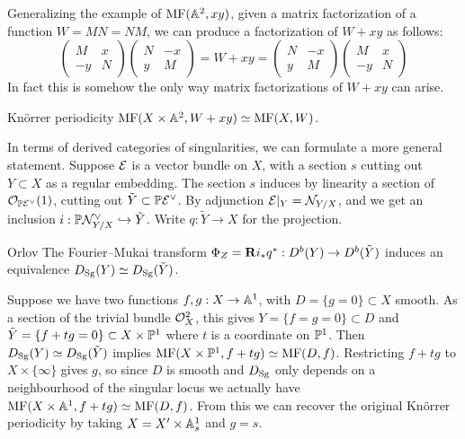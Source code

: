 Generalizing the example of $\MF(\A^2,xy)$, given a matrix factorization of a
function $W=MN=NM$, we can produce a factorization of $W+xy$ as follows:
\begin{equation*}
    \begin{pmatrix}
        M & x \\ -y & N
    \end{pmatrix}\begin{pmatrix}
        N & -x \\ y & M
    \end{pmatrix}
        = W+xy =
    \begin{pmatrix}
        N & -x \\ y & M
    \end{pmatrix}\begin{pmatrix}
        M & x \\ -y & N
    \end{pmatrix}
\end{equation*}
In fact this is somehow the only way matrix factorizations of $W+xy$ can arise.

\begin{theorem}{Kn\"orrer periodicity}{}
    $\MF(X\times\A^2,W+xy)\simeq\MF(X,W)$.
\end{theorem}

In terms of derived categories of singularities, we can formulate a more general
statement. Suppose $\calE$ is a vector bundle on $X$, with a section $s$ cutting
out $Y\subset X$ as a regular embedding. The section $s$ induces by linearity a
section of $\O_{\P\calE^\vee}(1)$, cutting out $\tilde Y\subset\P\calE^\vee$. By
adjunction $\calE|_Y=\calN_{Y/X}$, and we get an inclusion
$i:\P\calN^\vee_{Y/X}\hookrightarrow\tilde Y$. Write $q:\tilde Y\to X$ for the
projection.

\begin{theorem}{Orlov}{}
    The Fourier--Mukai transform $\Phi_Z=\dR i_*q^*:D^b(Y)\to D^b(\tilde Y)$
    induces an equivalence $D_\Sg(Y)\simeq D_\Sg(\tilde Y)$.
\end{theorem}

\begin{example}{}{}
    Suppose we have two functions $f,g:X\to\A^1$, with $D=\{g=0\}\subset X$
    smooth. As a section of the trivial bundle $\O_X^2$, this gives
    $Y=\{f=g=0\}\subset D$ and $\tilde Y=\{f+tg=0\}\subset X\times\P^1$
    where $t$ is a coordinate on $\P^1$. Then $D_\Sg(Y)\simeq D_\Sg(\tilde Y)$
    implies $\MF(X\times\P^1,f+tg)\simeq\MF(D,f)$. Restricting $f+tg$ to
    $X\times\{\infty\}$ gives $g$, so since $D$ is smooth and $D_\Sg$ only
    depends on a neighbourhood of the singular locus we actually have
    $\MF(X\times\A^1,f+tg)\simeq\MF(D,f)$. From this we can recover the original
    Kn\"orrer periodicity by taking $X=X'\times\A^1_s$ and $g=s$.
\end{example}

